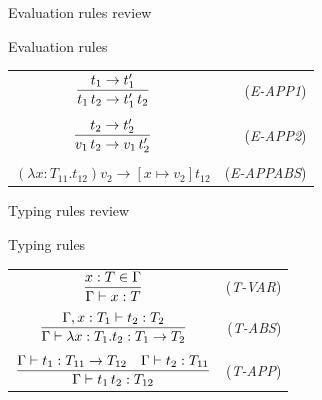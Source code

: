 \documentclass[8pt]{beamer}
\begin{document}
\begin{frame}{Evaluation rules review}
    \begin{block}{Evaluation rules}

        \begin{center}
            \begin{tabular}{ c r }
                    $\displaystyle {{t_{1} \rightarrow t_{1}^{\prime}}\over
                    {t_{1} \, t_{2} \rightarrow t_{1}^{\prime} \, t_{2}}}
                $ & (\emph{E-APP1}) \\ 
               & \\
               $\displaystyle{{t_{2} \rightarrow t_{2}^{\prime}}\over
                    {v_{1} \, t_{2} \rightarrow v_{1} \, t_{2}^{\prime}}}$ &
                         (\emph{E-APP2}) \\
               & \\ 
               $\displaystyle(\lambda x:T_{11}.t_{12})v_{2} \rightarrow 
                [x \mapsto v_{2}]t_{12}$ & (\emph{E-APPABS}) \\
            \end{tabular}
        \end{center}
    \end{block}
\end{frame}

\begin{frame}{Typing rules review}
    \begin{block}{Typing rules}
        \begin{center}
            \begin{tabular}{ c r }
                    $\displaystyle {{x:T \in \Gamma}\over
                    {\Gamma \vdash x:T}} $ & (\emph{T-VAR}) \\ 
               & \\
               $\displaystyle{{\Gamma, x:T_{1} \vdash t_{2}:T_{2}}\over
                    {\Gamma \vdash \lambda x:T_{1}.t_{2} : T_{1} 
                        \rightarrow T_{2}}} $ & (\emph{T-ABS}) \\
               & \\ 
               $\displaystyle{{\Gamma \vdash t_{1}:T_{11} \rightarrow T_{12} \quad
                     \Gamma \vdash t_{2}:T_{11}}\over
                    {\Gamma \vdash t_{1} \, t_{2} : T_{12}}} $ & (\emph{T-APP}) \\
            \end{tabular}
        \end{center}
    \end{block}
\end{frame}
\end{document}
